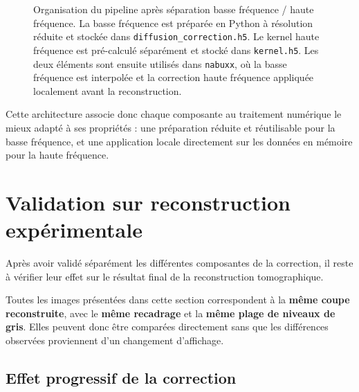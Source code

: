 \documentclass[11pt,a4paper]{report}
\begin{document}
\begin{figure}[H]
{
}

\caption{
Organisation du pipeline après séparation basse fréquence / haute fréquence.
La basse fréquence est préparée en Python à résolution réduite et stockée
dans \texttt{diffusion\_correction.h5}. Le kernel haute fréquence est
pré-calculé séparément et stocké dans \texttt{kernel.h5}. Les deux éléments
sont ensuite utilisés dans \texttt{nabuxx}, où la basse fréquence est
interpolée et la correction haute fréquence appliquée localement avant la
reconstruction.
}

\label{fig:pipeline_lf_hf}

\end{figure}

Cette architecture associe donc chaque composante au traitement numérique
le mieux adapté à ses propriétés : une préparation réduite et réutilisable
pour la basse fréquence, et une application locale directement sur les
données en mémoire pour la haute fréquence.






\chapter{Validation sur reconstruction expérimentale}

Après avoir validé séparément les différentes composantes de la correction,
il reste à vérifier leur effet sur le résultat final de la reconstruction
tomographique.

Toutes les images présentées dans cette section correspondent à la
\textbf{même coupe reconstruite}, avec le \textbf{même recadrage} et la
\textbf{même plage de niveaux de gris}. Elles peuvent donc être comparées
directement sans que les différences observées proviennent d'un changement
d'affichage.

\section{Effet progressif de la correction}
\end{document}

